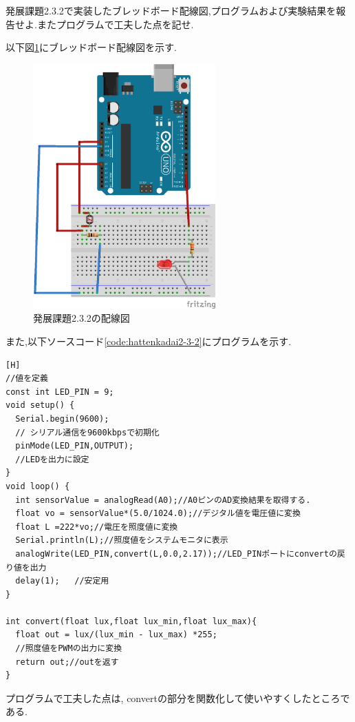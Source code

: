 \documentclass{jarticle}
\begin{document}
発展課題2.3.2で実装したブレッドボード配線図,プログラムおよび実験結果を報告せよ.またプログラムで工夫した点を記せ.


以下図\ref{fig:hattenkadai2-3-2bread}にブレッドボード配線図を示す.

\begin{figure}[H]
\begin{center}
\includegraphics[width=7.0cm]{images/kadai2-3-2_bread.png}
\caption{発展課題2.3.2の配線図}
\label{fig:hattenkadai2-3-2bread}
\end{center}
\end{figure}

また,以下ソースコード\ref{code:hattenkadai2-3-2}にプログラムを示す.

\begin{lstlisting}[caption=発展課題2.3.2,label=code:hattenkadai2-3-2][H]
//値を定義
const int LED_PIN = 9;
void setup() {
  Serial.begin(9600);
  // シリアル通信を9600kbpsで初期化
  pinMode(LED_PIN,OUTPUT);
  //LEDを出力に設定
}
void loop() {
  int sensorValue = analogRead(A0);//A0ピンのAD変換結果を取得する.
  float vo = sensorValue*(5.0/1024.0);//デジタル値を電圧値に変換
  float L =222*vo;//電圧を照度値に変換
  Serial.println(L);//照度値をシステムモニタに表示
  analogWrite(LED_PIN,convert(L,0.0,2.17));//LED_PINポートにconvertの戻り値を出力
  delay(1);   //安定用
}

int convert(float lux,float lux_min,float lux_max){
  float out = lux/(lux_min - lux_max) *255;
  //照度値をPWMの出力に変換
  return out;//outを返す
}
\end{lstlisting}
プログラムで工夫した点は, convertの部分を関数化して使いやすくしたところである.
\end{document}
